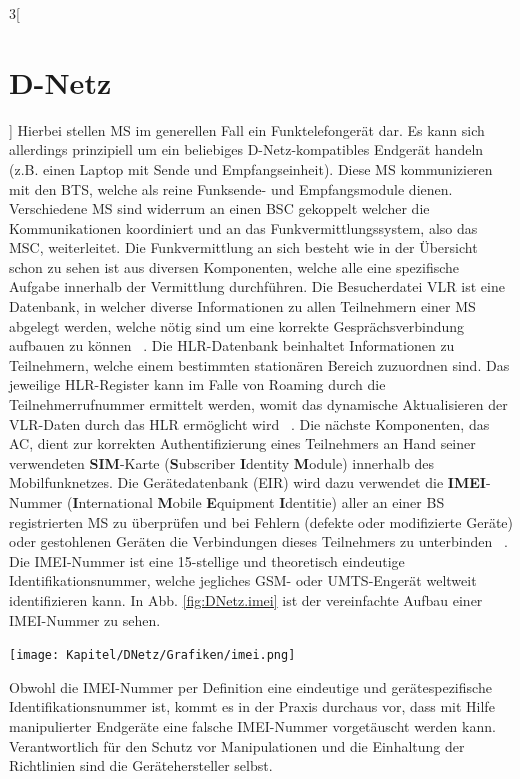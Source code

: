 \begin{multicols}{3}[\section{D-Netz}]
Hierbei stellen MS im generellen Fall ein Funktelefongerät dar. Es kann sich allerdings prinzipiell um ein beliebiges D-Netz-kompatibles Endgerät handeln (z.B. einen Laptop mit Sende und Empfangseinheit). Diese MS kommunizieren mit den BTS, welche als reine Funksende- und Empfangsmodule dienen. Verschiedene MS sind widerrum an einen BSC gekoppelt welcher die Kommunikationen koordiniert und an das Funkvermittlungssystem, also das MSC, weiterleitet. Die Funkvermittlung an sich besteht wie in der Übersicht schon zu sehen ist aus diversen Komponenten, welche alle eine spezifische Aufgabe innerhalb der Vermittlung durchführen. Die Besucherdatei VLR ist eine Datenbank, in welcher diverse Informationen zu allen Teilnehmern einer MS abgelegt werden, welche nötig sind um eine korrekte Gesprächsverbindung aufbauen zu können ~\cite{DNetz.8}. Die HLR-Datenbank beinhaltet Informationen zu Teilnehmern, welche einem bestimmten stationären Bereich zuzuordnen sind. Das jeweilige HLR-Register kann im Falle von Roaming durch die Teilnehmerrufnummer ermittelt werden, womit das dynamische Aktualisieren der VLR-Daten durch das HLR ermöglicht wird ~\cite{DNetz.9}. Die nächste Komponenten, das AC, dient zur korrekten Authentifizierung eines Teilnehmers an Hand seiner verwendeten \textbf{SIM}-Karte (\textbf{S}ubscriber \textbf{I}dentity \textbf{M}odule) innerhalb des Mobilfunknetzes. Die Gerätedatenbank (EIR) wird dazu verwendet die \textbf{IMEI}-Nummer (\textbf{I}nternational \textbf{M}obile \textbf{E}quipment \textbf{I}dentitie) aller an einer BS registrierten MS zu überprüfen und bei Fehlern (defekte oder modifizierte Geräte) oder gestohlenen Geräten die Verbindungen dieses Teilnehmers zu unterbinden ~\cite{DNetz.10}. Die IMEI-Nummer ist eine 15-stellige und theoretisch eindeutige Identifikationsnummer, welche jegliches GSM- oder UMTS-Engerät weltweit identifizieren kann. In Abb. \ref{fig:DNetz.imei} ist der vereinfachte Aufbau einer IMEI-Nummer zu sehen.     

\begin{Figure}
\texttt{[image: Kapitel/DNetz/Grafiken/imei.png]}
\label{fig:DNetz.imei}
\end{Figure}

Obwohl die IMEI-Nummer per Definition eine eindeutige und gerätespezifische Identifikationsnummer ist, kommt es in der Praxis durchaus vor, dass mit Hilfe manipulierter Endgeräte eine falsche IMEI-Nummer vorgetäuscht werden kann. Verantwortlich für den Schutz vor Manipulationen und die Einhaltung der Richtlinien sind die Gerätehersteller selbst.~\cite{DNetz.11}





\end{multicols}
